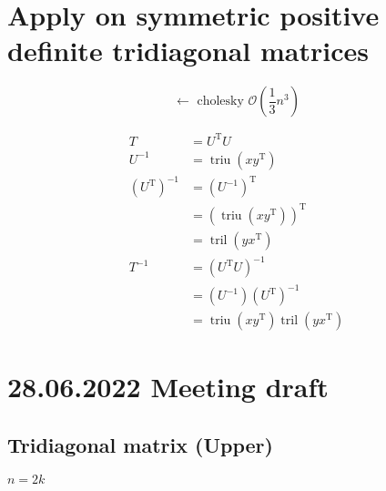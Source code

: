 \documentclass[11pt]{article}
\newcommand{\triu}{\mathop{\mathrm{triu}}}
\newcommand{\tril}{\mathop{\mathrm{tril}}}
\newcommand{\T}{\mathrm{T}}
\begin{document}
\section{Apply on symmetric positive definite tridiagonal matrices}
$$\longleftarrow \text { cholesky } \mathcal{O}\left(\frac{1}{3} n^{3}\right)$$

\begin{align*}
    T &= U^{\T} U \\
    U^{-1} &= \triu\left(x y^{\T}\right) \\
    \left(U^{\T}\right)^{-1} &= \left(U^{-1}\right)^{\T} \\
        &=\left(\triu \left(x y^{\T}\right)\right)^{\T} \\
        &= \tril\left(y x^{\T}\right) \\
    T^{-1} &= \left(U^{\T} U\right)^{-1} \\
        &= \left(U^{-1}\right)\left(U^{\T}\right)^{-1} \\
        &= \triu \left(x y^{\T}\right) \tril \left(y x^{\T}\right)
\end{align*}




\section{28.06.2022 Meeting draft}


\subsection{Tridiagonal matrix (Upper)}






$n = 2k$
\end{document}
